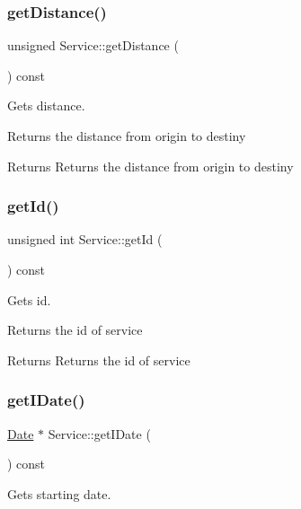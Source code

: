 \subsubsection{\texorpdfstring{get\+Distance()}{getDistance()}}
{\footnotesize\ttfamily unsigned Service\+::get\+Distance (\begin{DoxyParamCaption}{ }\end{DoxyParamCaption}) const}



Gets distance. 

Returns the distance from origin to destiny

\begin{DoxyReturn}{Returns}
Returns the distance from origin to destiny 
\end{DoxyReturn}
\mbox{\label{class_service_a5a19731d4fa91658afe908167fe66ad6}} 
\subsubsection{\texorpdfstring{get\+Id()}{getId()}}
{\footnotesize\ttfamily unsigned int Service\+::get\+Id (\begin{DoxyParamCaption}{ }\end{DoxyParamCaption}) const}



Gets id. 

Returns the id of service

\begin{DoxyReturn}{Returns}
Returns the id of service 
\end{DoxyReturn}
\mbox{\label{class_service_a3a8b665eff7933227303dc070bb29485}} 
\subsubsection{\texorpdfstring{get\+I\+Date()}{getIDate()}}
{\footnotesize\ttfamily \hyperlink{class_date}{Date} $\ast$ Service\+::get\+I\+Date (\begin{DoxyParamCaption}{ }\end{DoxyParamCaption}) const}



Gets starting date. 


